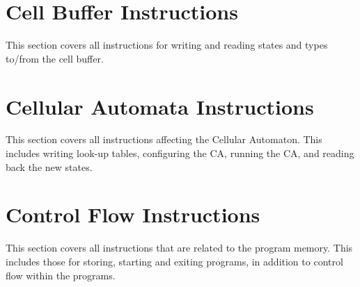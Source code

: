 \documentclass[a4paper]{article}
\begin{document}








\section{Cell Buffer Instructions}

This section covers all instructions for writing and reading states and types to/from the cell buffer.













\section{Cellular Automata Instructions}

This section covers all instructions affecting the Cellular Automaton.
This includes writing look-up tables, configuring the CA, running the CA, and reading back the new states.








\section{Control Flow Instructions}

This section covers all instructions that are related to the program memory.
This includes those for storing, starting and exiting programs, in addition to control flow within the programs.










\end{document}
